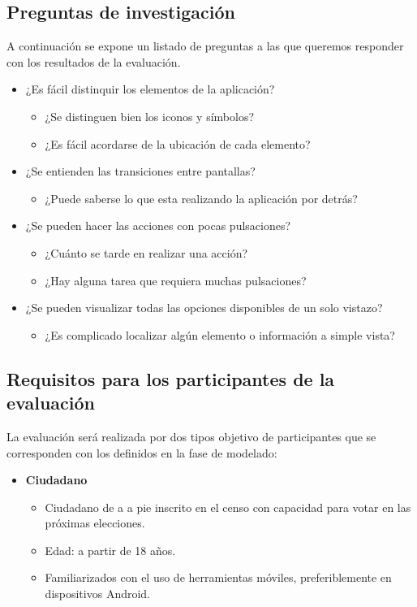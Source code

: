\subsection{Preguntas de investigación}

A continuación se expone un listado de preguntas a las que queremos responder con los resultados de la evaluación.

\begin{itemize}
 \item ¿Es fácil distinquir los elementos de la aplicación?
 \begin{itemize}
  \item ¿Se distinguen bien los iconos y símbolos?
  \item ¿Es fácil acordarse de la ubicación de cada elemento?
 \end{itemize}
 \item ¿Se entienden las transiciones entre pantallas?
 \begin{itemize}
  \item ¿Puede saberse lo que esta realizando la aplicación por detrás?
 \end{itemize}
  \item ¿Se pueden hacer las acciones con pocas pulsaciones?
  \begin{itemize}
   \item ¿Cuánto se tarde en realizar una acción?
   \item ¿Hay alguna tarea que requiera muchas pulsaciones?
  \end{itemize}
  \item ¿Se pueden visualizar todas las opciones disponibles de un solo vistazo?
  \begin{itemize}
   \item ¿Es complicado localizar algún elemento o información a simple vista?
  \end{itemize}
 \end{itemize}

\subsection{Requisitos para los participantes de la evaluación}

La evaluación será realizada por dos tipos objetivo de participantes que se corresponden con los definidos en la fase de modelado:

\begin{itemize}
 \item \textbf{Ciudadano}
 \begin{itemize}
  \item Ciudadano de a a pie inscrito en el censo con capacidad para votar en las próximas elecciones.
  \item Edad: a partir de 18 años.
  \item Familiarizados con el uso de herramientas móviles, preferiblemente en dispositivos Android.
 \end{itemize}
\end{itemize}

